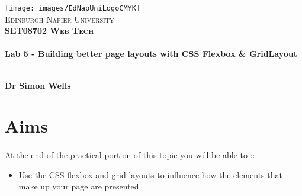 \documentclass[10pt, a4paper, twosize]{article}
\begin{document}

\begin{titlepage}
\vspace*{5cm}
\begin{center}
\texttt{[image: images/EdNapUniLogoCMYK]}~\\[1cm]

\textsc{\Large Edinburgh Napier University}\\[1.5cm]

\textsc{\LARGE \bfseries SET08702 Web Tech}\\[0.5cm]

\hrulefill \\[0.4cm]
{\huge \bfseries Lab 5 - Building better page layouts with CSS Flexbox \& GridLayout \\[0.4cm] }
\hrulefill \\[1.5cm]

\begin{minipage}{0.4\textwidth}
\begin{flushleft} \large
\textbf{Dr Simon Wells} \\
\end{flushleft}
\end{minipage}

\vfill

\end{center}
\end{titlepage}




%

\section*{Aims}
\paragraph{} At the end of the practical portion of this topic you will be able to ::

\begin{itemize}
    \item Use the CSS flexbox and grid layouts to influence how the elements that make up your page are presented
\end{itemize}
\end{document}
